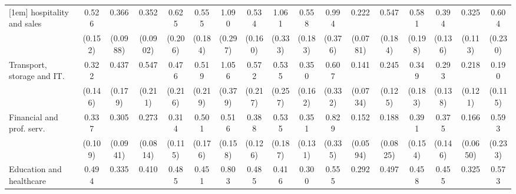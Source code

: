 {\begin{tabular}{l*{16}{c}}
[1em]
hospitality and sales&       0.526\sym{*}  &       0.366\sym{***}&       0.352\sym{***}&       0.625         &       0.555         &       1.090         &       0.534\sym{*}  &       1.061         &       0.558         &       0.994         &       0.222\sym{***}&       0.547         &       0.581         &       0.394\sym{**} &       0.325\sym{**} &       0.604         \\
                    &     (0.152)         &    (0.0988)         &    (0.0902)         &     (0.206)         &     (0.184)         &     (0.297)         &     (0.160)         &     (0.333)         &     (0.183)         &     (0.376)         &    (0.0781)         &     (0.184)         &     (0.198)         &     (0.136)         &     (0.113)         &     (0.230)         \\
[1em]
Transport, storage and IT.&       0.322\sym{*}  &       0.437\sym{*}  &       0.547         &       0.476         &       0.519         &       1.056         &       0.572         &       0.535         &       0.350\sym{*}  &       0.607         &       0.141\sym{***}&       0.245\sym{**} &       0.349\sym{*}  &       0.293\sym{**} &       0.218\sym{**} &       0.190\sym{**} \\
                    &     (0.146)         &     (0.179)         &     (0.211)         &     (0.216)         &     (0.219)         &     (0.379)         &     (0.217)         &     (0.257)         &     (0.162)         &     (0.332)         &    (0.0734)         &     (0.125)         &     (0.183)         &     (0.138)         &     (0.121)         &     (0.115)         \\
[1em]
Financial and prof. serv.&       0.337\sym{***}&       0.305\sym{***}&       0.273\sym{***}&       0.314\sym{**} &       0.501\sym{*}  &       0.516\sym{*}  &       0.388\sym{**} &       0.535         &       0.351\sym{**} &       0.829         &       0.152\sym{***}&       0.188\sym{***}&       0.391\sym{*}  &       0.375\sym{*}  &       0.166\sym{***}&       0.593         \\
                    &     (0.109)         &    (0.0941)         &    (0.0814)         &     (0.115)         &     (0.176)         &     (0.158)         &     (0.126)         &     (0.187)         &     (0.131)         &     (0.335)         &    (0.0594)         &    (0.0825)         &     (0.154)         &     (0.146)         &    (0.0650)         &     (0.233)         \\
[1em]
Education and healthcare&       0.494\sym{*}  &       0.335\sym{***}&       0.410\sym{**} &       0.485\sym{*}  &       0.451\sym{*}  &       0.803         &       0.485\sym{*}  &       0.416\sym{*}  &       0.300\sym{***}&       0.555         &       0.292\sym{***}&       0.497         &       0.458\sym{*}  &       0.455\sym{*}  &       0.325\sym{**} &       0.573         \\

\end{tabular}}
